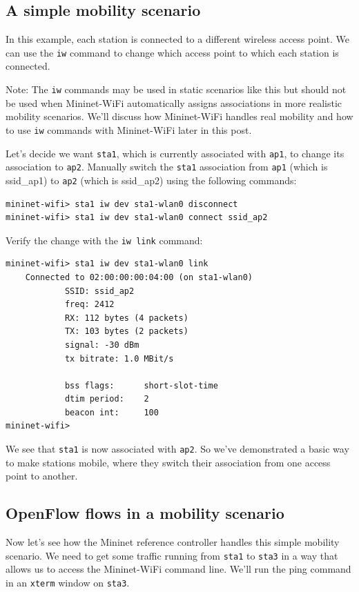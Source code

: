 \subsection{A simple mobility scenario}

In this example, each station is connected to a different wireless access point. We can use the \texttt{iw} command to change which access point to which each station is connected. 

Note: The \texttt{iw} commands may be used in static scenarios like this but should not be used when Mininet-WiFi automatically assigns associations in more realistic mobility scenarios. We’ll discuss how Mininet-WiFi handles real mobility and how to use \texttt{iw} commands with Mininet-WiFi later in this post.

Let's decide we want \texttt{sta1}, which is currently associated with \texttt{ap1}, to change its association to \texttt{ap2}. Manually switch the \texttt{sta1} association from \texttt{ap1} (which is ssid\_ap1) to \texttt{ap2} (which is ssid\_ap2) using the following commands:

\begin{verbatim}
mininet-wifi> sta1 iw dev sta1-wlan0 disconnect
mininet-wifi> sta1 iw dev sta1-wlan0 connect ssid_ap2
\end{verbatim}

         
Verify the change with the \texttt{iw link} command:

\begin{verbatim}
mininet-wifi> sta1 iw dev sta1-wlan0 link
    Connected to 02:00:00:00:04:00 (on sta1-wlan0)
            SSID: ssid_ap2
            freq: 2412
            RX: 112 bytes (4 packets)
            TX: 103 bytes (2 packets)
            signal: -30 dBm
            tx bitrate: 1.0 MBit/s
    
            bss flags:      short-slot-time
            dtim period:    2
            beacon int:     100
mininet-wifi>
\end{verbatim}
    
We see that \texttt{sta1} is now associated with \texttt{ap2}. So we've demonstrated a basic way to make stations mobile, where they switch their association from one access point to another.

\subsection{OpenFlow flows in a mobility scenario}

Now let's see how the Mininet reference controller handles this simple mobility scenario. We need to get some traffic running from \texttt{sta1} to \texttt{sta3} in a way that allows us to access the Mininet-WiFi command line. We'll run the ping command in an \texttt{xterm} window on \texttt{sta3}.

